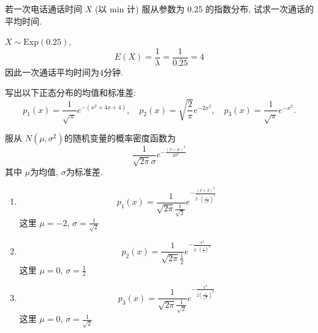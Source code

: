 \documentclass[../main.tex]{subfiles}
\begin{document}
\begin{exercise}{}{}
若一次电话通话时间 $X$ (以 min 计) 服从参数为 0.25 的指数分布, 试求一次通话的平均时间.
\end{exercise}
\begin{solution}
   \(  X\sim  \mathrm{Exp}\left( 0.25 \right) \),  \[
  E\left( X \right)= \frac{1 }{ \lambda  }= \frac{1 }{0.25 }= 4   
  \]因此一次通话平均时间为4分钟. 
\end{solution}

\begin{exercise}{}{}
写出以下正态分布的均值和标准差:
\[
p_1(x) = \frac{1}{\sqrt{\pi}} e^{-(x^2 + 4x + 4)}, \quad p_2(x) = \sqrt{\frac{2}{\pi}} e^{-2x^2}, \quad p_3(x) = \frac{1}{\sqrt{\pi}} e^{-x^2}.
\]
\end{exercise}
\begin{solution}
 服从 \(  N\left( \mu ,  \sigma^{2}  \right)   \)的随机变量的概率密度函数为  \[
 \frac{1 }{\sqrt{2 \pi } \sigma  }e^{-\frac{\left( x-\mu  \right)^{2}  }{2 \sigma ^{2} } } 
 \]其中 \(  \mu   \)为均值,  \(   \sigma   \)为标准差.  
 \begin{enumerate}
  \item  \[
  p_1\left( x \right)= \frac{1 }{\sqrt{2 \pi } \frac{1 }{\sqrt{2} }  }e^{- \frac{\left( x+ 2 \right)^{2}  }{ 2\cdot  \left( \frac{1 }{\sqrt{2} }  \right)^{2} } }  
  \] 这里 \(  \mu = -2  \), \(   \sigma = \frac{1 }{\sqrt{2} }   \)  
  \item \[
  p_2\left( x \right)= \frac{1 }{\sqrt{2 \pi } \frac{1 }{2 }  }e^{-\frac{x^{2} }{2\cdot \left( \frac{1 }{2 }  \right)^{2}   } }  
  \]这里 \(  \mu = 0  \), \(   \sigma = \frac{1 }{2 }   \)\
  \item \[
  p_3\left( x \right)= \frac{1 }{\sqrt{2 \pi } \frac{1 }{\sqrt{2} }  }e^{-\frac{x^{2} }{2 \left( \frac{1 }{\sqrt{2} }  \right)^{2}  } }  
  \]  这里 \(  \mu = 0  \), \(   \sigma = \frac{1 }{\sqrt{2} }   \)  
 \end{enumerate}
 
\end{solution}
\end{document}
